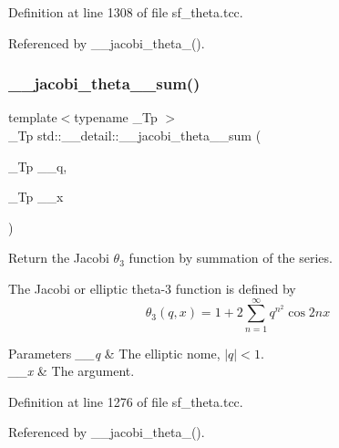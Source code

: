 Definition at line 1308 of file sf\+\_\+theta.\+tcc.



Referenced by \+\_\+\+\_\+jacobi\+\_\+theta\+\_().

\mbox{\label{namespacestd_1_1____detail_a07e080795e7f80c5a0b733d6bac49675}} 
\subsubsection{\texorpdfstring{\+\_\+\+\_\+jacobi\+\_\+theta\+\_\+\_\+sum()}{\_\_jacobi\_theta\_3\_sum()}}
{\footnotesize\ttfamily template$<$typename \+\_\+\+Tp $>$ \\
\+\_\+\+Tp std\+::\+\_\+\+\_\+detail\+::\+\_\+\+\_\+jacobi\+\_\+theta\+\_\+\_\+sum (\begin{DoxyParamCaption}\item[{\+\_\+\+Tp}]{\+\_\+\+\_\+q,  }\item[{\+\_\+\+Tp}]{\+\_\+\+\_\+x }\end{DoxyParamCaption})}

Return the Jacobi $ \theta_3 $ function by summation of the series.

The Jacobi or elliptic theta-\/3 function is defined by \[ \theta_3(q,x) = 1 + 2\sum_{n=1}^{\infty} q^{n^2}\cos{2nx} \]


\begin{DoxyParams}{Parameters}
{\em \+\_\+\+\_\+q} & The elliptic nome, $ |q| < 1 $. \\
\hline
{\em \+\_\+\+\_\+x} & The argument. \\
\hline
\end{DoxyParams}


Definition at line 1276 of file sf\+\_\+theta.\+tcc.



Referenced by \+\_\+\+\_\+jacobi\+\_\+theta\+\_().

\mbox{\label{namespacestd_1_1____detail_a1cb3d69015e808baeaf98cd3310f38c3}} 
